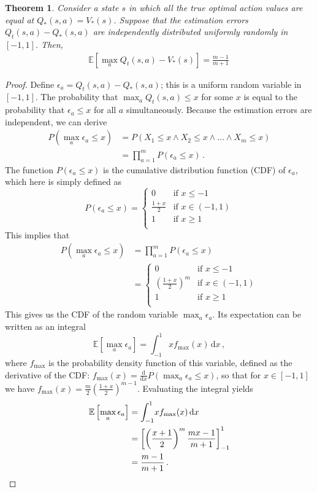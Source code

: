 \documentclass[letterpaper]{article}
\def\E#1{\mathbb{E}\left[#1\right]}
\newtheorem{theorem}{Theorem}
\begin{document}
\begin{theorem}
Consider a state $s$ in which all the true optimal action values are equal at $Q_*(s,a) = V_*(s)$.  Suppose that the estimation errors $Q_t(s,a) - Q_*(s,a)$ are independently distributed uniformly randomly in $[-1,1]$.  Then,
\begin{align*}
\E{ \max_a Q_t(s,a) - V_*(s) } = \frac{m-1}{m+1} \,
\end{align*}
\end{theorem}
\begin{proof}
Define $\epsilon_a = Q_t(s,a) - Q_*(s,a)$; this is a uniform random variable in $[-1,1]$.  The probability that $\max_a Q_t(s,a) \le x$ for some $x$ is equal to the probability that $\epsilon_a \le x$ for all $a$ simultaneously.  Because the estimation errors are independent, we can derive
\begin{align*}
P( \max_a \epsilon_a \le x )
& = P( X_1 \le x \land X_2 \le x \land \ldots \land X_m \le x )\\
& = \prod_{a=1}^m P( \epsilon_a \le x )\,.
\end{align*}
The function $P( \epsilon_a \le x )$ is the cumulative distribution function (CDF) of $\epsilon_a$, which here is simply defined as
\[
P( \epsilon_a \le x ) = 
\left\{
\begin{array}{ll}
0 & \text{if $x \le -1$} \\
\frac{1+x}{2} & \text{if $x \in (-1,1)$} \\
1 & \text{if $x \ge 1$} \\
\end{array}
\right.
\]
This implies that
\begin{align*}
P( \max_a \epsilon_a \le x )
& = \prod_{a=1}^m P( \epsilon_a \le x )\\
& = 
\left\{
\begin{array}{ll}
0 & \text{if $x \le -1$} \\
\left(\frac{1+x}{2}\right)^m & \text{if $x \in (-1,1)$} \\
1 & \text{if $x \ge 1$} \\
\end{array}
\right.
\end{align*}
This gives us the CDF of the random variable $\max_a \epsilon_a$.  Its expectation can be written as an integral
\[
\E{ \max_a \epsilon_a } = \int_{-1}^{1} \! x f_{\max}(x)\,\text{d}x \,,
\]
where $f_{\max}$ is the probability density function of this variable, defined as the derivative of the CDF: $f_{\max}(x) = \frac{\text{d}}{\text{d}x} P( \max_a \epsilon_a \le x )$, so that for $x \in [-1,1]$ we have $f_{\max}(x) = \frac{m}{2} \left(\frac{1+x}{2}\right)^{m-1}$.  Evaluating the integral yields
\begin{align*}
\E{ \max_a \epsilon_a }
&= \int_{-1}^{1} \! x f_{\max}(x)\,\text{d}x \\
&= \left[ \left(\frac{x+1}{2}\right)^m \frac{m x - 1}{m+1} \right]_{-1}^1 \\
&= \frac{m-1}{m+1} \,. \qedhere
\end{align*}
\end{proof}
\end{document}
